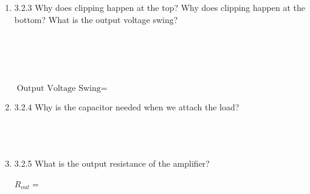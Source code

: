 \documentclass{article}
\begin{document}
\begin {enumerate}
	\item[3.2.3] Why does clipping happen at the top? Why does clipping happen at the bottom? What is the output voltage swing? \\~\\~\\~\\~\\~\\
	  $\boxed{\text{Output Voltage Swing} = ~~~~~~~~~~~~~~~~~~~~~~~~~~~~~~~~~~~~~~}$

        \item[3.2.4] Why is the capacitor needed when we attach the load? \\~\\~\\~\\

	\item[3.2.5] What is the output resistance of the amplifier? \\~\\
	  $\boxed{R_{out}  = ~~~~~~~~~~~~~~~~~~~~~~~~~~~~~~~~~~~~~~}$


\end{enumerate}
\end{document}
